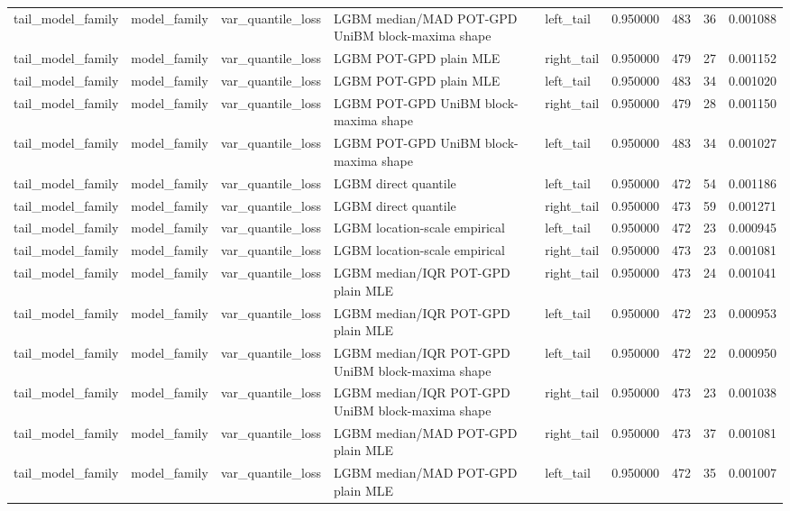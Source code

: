 \begin{tabular}{lllllrrr}
tail\_model\_family & model\_family & var\_quantile\_loss & LGBM median/MAD POT-GPD UniBM block-maxima shape & left\_tail & 0.950000 & 483 & 36 & 0.001088 \\
tail\_model\_family & model\_family & var\_quantile\_loss & LGBM POT-GPD plain MLE & right\_tail & 0.950000 & 479 & 27 & 0.001152 \\
tail\_model\_family & model\_family & var\_quantile\_loss & LGBM POT-GPD plain MLE & left\_tail & 0.950000 & 483 & 34 & 0.001020 \\
tail\_model\_family & model\_family & var\_quantile\_loss & LGBM POT-GPD UniBM block-maxima shape & right\_tail & 0.950000 & 479 & 28 & 0.001150 \\
tail\_model\_family & model\_family & var\_quantile\_loss & LGBM POT-GPD UniBM block-maxima shape & left\_tail & 0.950000 & 483 & 34 & 0.001027 \\
tail\_model\_family & model\_family & var\_quantile\_loss & LGBM direct quantile & left\_tail & 0.950000 & 472 & 54 & 0.001186 \\
tail\_model\_family & model\_family & var\_quantile\_loss & LGBM direct quantile & right\_tail & 0.950000 & 473 & 59 & 0.001271 \\
tail\_model\_family & model\_family & var\_quantile\_loss & LGBM location-scale empirical & left\_tail & 0.950000 & 472 & 23 & 0.000945 \\
tail\_model\_family & model\_family & var\_quantile\_loss & LGBM location-scale empirical & right\_tail & 0.950000 & 473 & 23 & 0.001081 \\
tail\_model\_family & model\_family & var\_quantile\_loss & LGBM median/IQR POT-GPD plain MLE & right\_tail & 0.950000 & 473 & 24 & 0.001041 \\
tail\_model\_family & model\_family & var\_quantile\_loss & LGBM median/IQR POT-GPD plain MLE & left\_tail & 0.950000 & 472 & 23 & 0.000953 \\
tail\_model\_family & model\_family & var\_quantile\_loss & LGBM median/IQR POT-GPD UniBM block-maxima shape & left\_tail & 0.950000 & 472 & 22 & 0.000950 \\
tail\_model\_family & model\_family & var\_quantile\_loss & LGBM median/IQR POT-GPD UniBM block-maxima shape & right\_tail & 0.950000 & 473 & 23 & 0.001038 \\
tail\_model\_family & model\_family & var\_quantile\_loss & LGBM median/MAD POT-GPD plain MLE & right\_tail & 0.950000 & 473 & 37 & 0.001081 \\
tail\_model\_family & model\_family & var\_quantile\_loss & LGBM median/MAD POT-GPD plain MLE & left\_tail & 0.950000 & 472 & 35 & 0.001007 \\

\end{tabular}
